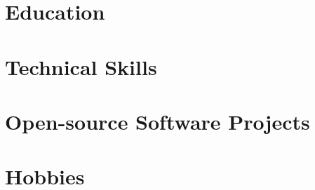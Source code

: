 \documentclass[11pt]{article}
\begin{document}
\section*{\selectfont Education}



\section*{\selectfont Technical Skills} 


\section*{\selectfont Open-source Software Projects} 
 



% 



\section*{\selectfont Hobbies} 
 

% 
 

%
\end{document}
